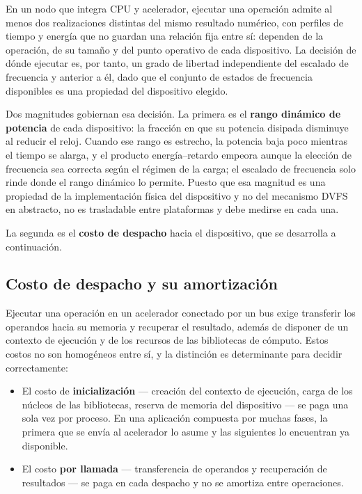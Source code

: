 \documentclass[12pt,oneside,spanish]{book}
\begin{document}
En un nodo que integra CPU y acelerador, ejecutar una operación admite al menos dos realizaciones distintas del mismo resultado numérico, con perfiles de tiempo y energía que no guardan una relación fija entre sí: dependen de la operación, de su tamaño y del punto operativo de cada dispositivo. La decisión de dónde ejecutar es, por tanto, un grado de libertad independiente del escalado de frecuencia y anterior a él, dado que el conjunto de estados de frecuencia disponibles es una propiedad del dispositivo elegido.

Dos magnitudes gobiernan esa decisión. La primera es el \textbf{rango dinámico de potencia} de cada dispositivo: la fracción en que su potencia disipada disminuye al reducir el reloj. Cuando ese rango es estrecho, la potencia baja poco mientras el tiempo se alarga, y el producto energía--retardo empeora aunque la elección de frecuencia sea correcta según el régimen de la carga; el escalado de frecuencia solo rinde donde el rango dinámico lo permite. Puesto que esa magnitud es una propiedad de la implementación física del dispositivo y no del mecanismo DVFS en abstracto, no es trasladable entre plataformas y debe medirse en cada una.

La segunda es el \textbf{costo de despacho} hacia el dispositivo, que se desarrolla a continuación.

\subsection{Costo de despacho y su amortización}
\label{sec:marco-despacho}

Ejecutar una operación en un acelerador conectado por un bus exige transferir los operandos hacia su memoria y recuperar el resultado, además de disponer de un contexto de ejecución y de los recursos de las bibliotecas de cómputo. Estos costos no son homogéneos entre sí, y la distinción es determinante para decidir correctamente:

\begin{itemize}
    \item El costo de \textbf{inicialización} --- creación del contexto de ejecución, carga de los núcleos de las bibliotecas, reserva de memoria del dispositivo --- se paga una sola vez por proceso. En una aplicación compuesta por muchas fases, la primera que se envía al acelerador lo asume y las siguientes lo encuentran ya disponible.
    \item El costo \textbf{por llamada} --- transferencia de operandos y recuperación de resultados --- se paga en cada despacho y no se amortiza entre operaciones.
\end{itemize}
\end{document}
